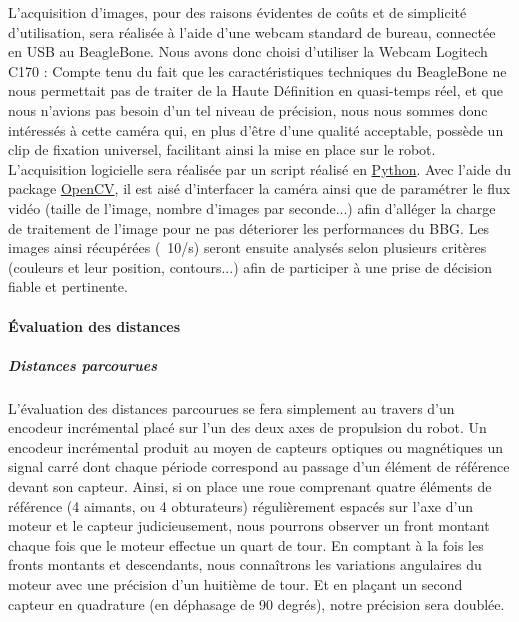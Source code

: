 			L'acquisition d'images, pour des raisons évidentes de coûts et  de simplicité d'utilisation, sera réalisée à l'aide d'une webcam standard de bureau, connectée en USB au BeagleBone. Nous avons donc choisi d'utiliser la Webcam Logitech C170 :
			Compte tenu du fait que les caractéristiques techniques du BeagleBone ne nous permettait pas de traiter de la Haute Définition en quasi-temps réel, et que nous n'avions pas besoin d'un tel niveau de précision, nous nous sommes donc intéressés à cette caméra qui, en plus d'être d'une qualité acceptable, possède un clip de fixation universel, facilitant ainsi la mise en place sur le robot. \\

			L'acquisition logicielle sera réalisée par un script réalisé en \href{https://www.python.org/}{Python}. Avec l'aide du package \href{https://www.http://opencv.org/}{OpenCV}, il est aisé d'interfacer la caméra ainsi que de paramétrer le flux vidéo (taille de l'image, nombre d'images par seconde...) afin d'alléger la charge de traitement de l'image pour ne pas déteriorer les performances du BBG. Les images ainsi récupérées (~10/s) seront ensuite analysés selon plusieurs critères (couleurs et leur position, contours...) afin de participer à une prise de décision fiable et pertinente.
			
		\paragraph{Évaluation des distances}

			\subparagraph*{Distances parcourues}

				L'évaluation des distances parcourues se fera simplement au travers d'un encodeur incrémental placé sur l'un des deux axes de propulsion du robot. Un encodeur incrémental produit au moyen de capteurs optiques ou magnétiques un signal carré dont chaque période correspond au passage d'un élément de référence devant son capteur.
				Ainsi, si on place une roue comprenant quatre éléments de référence (4 aimants, ou 4 obturateurs) régulièrement espacés sur l'axe d'un moteur et le capteur judicieusement, nous pourrons observer un front montant chaque fois que le moteur effectue un quart de tour. En comptant à la fois les fronts montants et descendants, nous connaîtrons les variations angulaires du moteur avec une précision d'un huitième de tour. Et en plaçant un second capteur en quadrature (en déphasage de 90 degrés), notre précision sera doublée.\\

